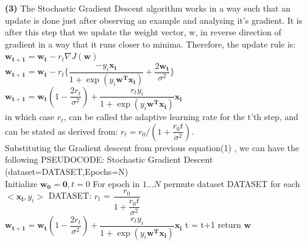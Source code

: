 \documentclass[11pt]{article}
\renewcommand\part[1]{\vspace{.10in}\textbf{(#1)}}
\begin{document}
\part{3}
The Stochastic Gradient Descent algorithm works in a way such that an update is done just after observing an example and analysing it's gradient. It is after this step that we update the weight vector, w, in reverse direction of gradient in a way that it runs closer to minima. Therefore, the update rule is:\\ 
$ \mathbf{w_{t+1}} = \mathbf{w_t} - r_t \nabla J(\mathbf{w}) $\\
$ \mathbf{w_{t+1}} = \mathbf{w_t} - r_t\{ \dfrac{-y_i\mathbf{x_i}}{1 + \exp(y_i\mathbf{w^Tx_i})} + \dfrac{2\mathbf{w_t}}{\sigma^2}\}$\\
$\mathbf{w_{t+1}} = \mathbf{w_t}(1 - \dfrac{2r_t}{\sigma^2}) + \dfrac{r_t y_i}{1 + \exp(y_i\mathbf{w^Tx_i})}\mathbf{x_i}$\\
in which case $r_t$, can be called the adaptive learning rate for the t'th step, and can be stated as derived from: $r_t = {r_0}/{(1 + \dfrac{r_0t}{\sigma^2})}$.\\
Substituting the Gradient descent from previous equation(1) , we can have the following PSEUDOCODE: \newline
	{Stochastic Gradient Descent (dataset=DATASET,Epochs=N)} \\
	\hspace*{2.5cm} Initialize ${\mathbf{w_0 = 0}}, t = 0$ \newline
	\hspace*{2.5cm} For epoch in $1 \dots N$ \newline
	\hspace*{3.5cm}    permute dataset DATASET \newline
	\hspace*{3.5cm}    for each $<{\mathbf{x_i}},y_i>$ DATASET: \newline
	\hspace*{4.5cm}    	$r_t$ = $\dfrac{r_0}{1 + \dfrac{r_0t}{\sigma^2}}$ \newline
	\hspace*{4.5cm}		$ \mathbf{w_{t+1}} = \mathbf{w_t}(1 - \dfrac{2r_t}{\sigma^2}) + \dfrac{r_t y_i}{1 + \exp(y_i\mathbf{w^Tx_i})}\mathbf{x_i} $ \newline
	\hspace*{4.5cm}		t = t+1 \newline
	\hspace*{2.5cm} return $\mathbf{w}$\\[10pt]
\end{document}
